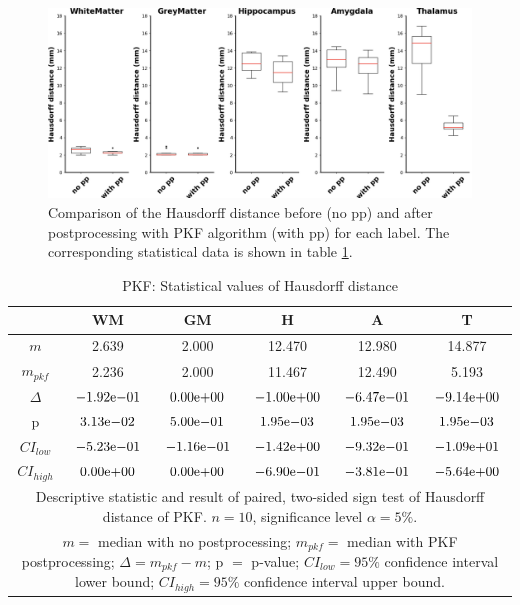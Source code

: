 \documentclass[journal]{IEEEtran}
\begin{document}
\begin{figure}[ht]
\centering
\includegraphics[width=\textwidth]{img/boxplots/PKF-HD.png}
\caption{Comparison of the Hausdorff distance before (no pp) and after postprocessing with PKF algorithm (with pp) for each label. The corresponding statistical data is shown in table \ref{tbl_pkf_hd}.
}
\label{fig_pkf-hd}
\end{figure}

\begin{table}[ht]

\renewcommand{\arraystretch}{1.3}
\caption{PKF: Statistical values of Hausdorff distance}
\label{tbl_pkf_hd}
\centering
\tabcolsep=0.06cm
\begin{tabular}{c|c|c|c|c|c}
\hline
 & WM & GM & H & A & T\\
\hline
$m$ &2.639&2.000&12.470&12.980&14.877\\
$m_{pkf}$&2.236&2.000&11.467&12.490&5.193\\
$\Delta$&${-1.92}\mathrm{e}{-01}$&${0.00}\mathrm{e}{+00}$&${-1.00}\mathrm{e}{+00}$&${-6.47}\mathrm{e}{-01}$&${-9.14}\mathrm{e}{+00}$\\
p&${3.13}\mathrm{e}{-02}$&${5.00}\mathrm{e}{-01}$&${1.95}\mathrm{e}{-03}$&${1.95}\mathrm{e}{-03}$&${1.95}\mathrm{e}{-03}$\\
$CI_{low}$&${-5.23}\mathrm{e}{-01}$&${-1.16}\mathrm{e}{-01}$&${-1.42}\mathrm{e}{+00}$&${-9.32}\mathrm{e}{-01}$&${-1.09}\mathrm{e}{+01}$\\
$CI_{high}$&${0.00}\mathrm{e}{+00}$&${0.00}\mathrm{e}{+00}$&${-6.90}\mathrm{e}{-01}$&${-3.81}\mathrm{e}{-01}$&${-5.64}\mathrm{e}{+00}$\\
\hline
\multicolumn{6}{p{3.4in}}{Descriptive statistic and result of paired, two-sided sign test of Hausdorff distance of PKF. $n=10$, significance level $\alpha = 5\%$.}\\
\multicolumn{6}{p{3.4in}}{$m=$ median with no postprocessing; $m_{pkf}=$ median with PKF postprocessing; $\Delta=m_{pkf}-m$; p $=$ p-value;  $CI_{low}= 95\%$ confidence interval lower bound; $CI_{high}= 95\%$ confidence interval upper bound.}\\

\end{tabular}

\end{table}
\end{document}
